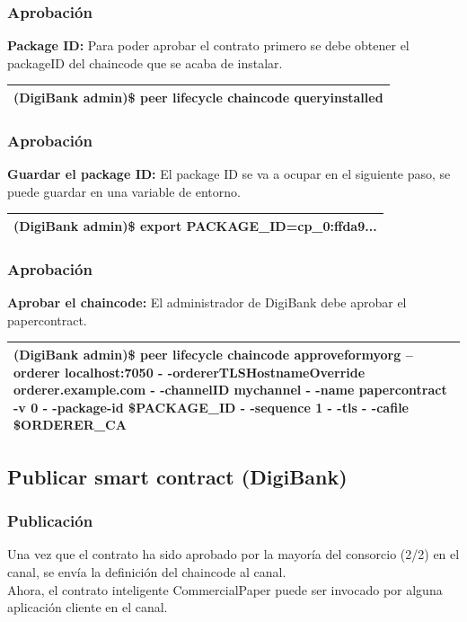 \documentclass{beamer}
\begin{document}
	\begin{frame}
		\frametitle{Aprobación}
		\textbf{Package ID:} Para poder aprobar el contrato primero se debe obtener el packageID del chaincode que se acaba de instalar.\\
		\begin{center}
			\begin{tabulary}{\linewidth}{L}
				\hline
				(DigiBank admin)\$ peer lifecycle chaincode queryinstalled \\
				\hline
			\end{tabulary} 
		\end{center}
	\end{frame}
	
	\begin{frame}
		\frametitle{Aprobación}
		\textbf{Guardar el package ID:} El package ID se va a ocupar en el siguiente paso, se puede guardar en una variable de entorno.\\
		\begin{center}
			\begin{tabulary}{\linewidth}{L}
				\hline
				(DigiBank admin)\$ export PACKAGE\_ID=cp\_0:ffda9... \\
				\hline
			\end{tabulary} 
		\end{center}
	\end{frame}
	
	\begin{frame}
		\frametitle{Aprobación}
		\textbf{Aprobar el chaincode:} El administrador de DigiBank debe aprobar el papercontract.\\
		\begin{center}
			\begin{tabulary}{\linewidth}{L}
				\hline
				(DigiBank admin)\$ peer lifecycle chaincode approveformyorg --orderer localhost:7050 - -ordererTLSHostnameOverride orderer.example.com - -channelID mychannel - -name papercontract -v 0 - -package-id \$PACKAGE\_ID - -sequence 1 - -tls - -cafile \$ORDERER\_CA \\
				\hline
			\end{tabulary} 
		\end{center}
	\end{frame}
	
	\subsection{Publicar smart contract (DigiBank)}
	
	\begin{frame}
		\frametitle{Publicación}
		Una vez que el contrato ha sido aprobado por la mayoría del consorcio (2/2) en el canal, se envía la definición del chaincode al canal.\\
		\vspace{4mm}
		Ahora, el contrato inteligente CommercialPaper puede ser invocado por alguna aplicación cliente en el canal.
	\end{frame}
\end{document}
